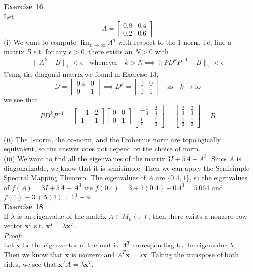 \documentclass[letterpaper,12pt]{article}
\let\vec\mathbf
\theoremstyle{definition}
\begin{document}
\textbf{Exercise 16} \\
Let
\[ A =
\begin{bmatrix}
  0.8 & 0.4 \\
  0.2 & 0.6
\end{bmatrix}
\]
(i) We want to compute $\lim_{n \to \infty} A^n$ with respect to the 1-norm, i.e, find a matrix $B$ s.t. for any $\epsilon > 0$, there exists an $N > 0$ with
\begin{align*}
  \|A^k - B\|_1 < \epsilon \quad \text{whenever} \quad k > N \implies \|PD^kP^{-1} - B\|_1 < \epsilon
\end{align*}
Using the diagonal matrix we found in Exercise 13,
\[ D =
\begin{bmatrix}
  0.4 & 0 \\
  0 & 1
\end{bmatrix}
\implies
D^k =
\begin{bmatrix}
  0 & 0 \\
  0 & 1
\end{bmatrix}
\quad \text{as} \quad k \to \infty
\]
we see that
\[ PD^kP^{-1} =
\begin{bmatrix}
  -1 & 2 \\
  1 & 1
\end{bmatrix}
\begin{bmatrix}
  0 & 0 \\
  0 & 1
\end{bmatrix}
\begin{bmatrix}
  -\frac{1}{3} & \frac{2}{3} \\
  \frac{1}{3} & \frac{1}{3}
\end{bmatrix}
=
\begin{bmatrix}
  \frac{2}{3} & \frac{2}{3} \\
  \frac{1}{3} & \frac{1}{3}
\end{bmatrix}
= B
\]

(ii) The 1-norm, the $\infty$-norm, and the Frobenius norm are topologically equivalent, so the answer does not depend on the choice of norm. \\

(iii) We want to find all the eigenvalues of the matrix $3I + 5A + A^3$. Since $A$ is diagonalizable, we know that it is semisimple. Then we can apply the Semisimple Spectral Mapping Theorem. The eigenvalues of $A$ are $\{0.4, 1\}$, so the eigenvalues of $f(A) = 3I + 5A + A^3$ are $f(0.4) = 3 + 5(0.4) + 0.4^3 = 5.064$ and $f(1) = 3 + 5(1) + 1^3 = 9$. \\

\textbf{Exercise 18} \\
If $\lambda$ is an eigenvalue of the matrix $A \in M_n(
\mathbb{F})$, then there exists a nonzero row vector $\vec{x}^T$ s.t. $\vec{x}^T = \lambda \vec{x}^T$. \\
\textit{Proof:} \\
Let $\vec{x}$ be the eigenvector of the matrix $A^T$ corresponding to the eigenvalue $\lambda$. Then we know that $\vec{x}$ is nonzero and $A^T\vec{x} = \lambda\vec{x}$. Taking the transpose of both sides, we see that $\vec{x}^T A = \lambda\vec{x}^T$. \\
\end{document}
